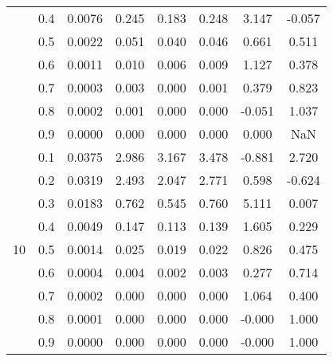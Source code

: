 \documentclass[11pt,a4paper]{report}
\begin{document}
\begin{longtable}{ | c | c || c | c | c | c | c | c | }
 & 0.4 & 0.0076 & 0.245 & 0.183 & 0.248 & 3.147 & -0.057 \\
 & 0.5 & 0.0022 & 0.051 & 0.040 & 0.046 & 0.661 & 0.511 \\
 & 0.6 & 0.0011 & 0.010 & 0.006 & 0.009 & 1.127 & 0.378 \\
 & 0.7 & 0.0003 & 0.003 & 0.000 & 0.001 & 0.379 & 0.823 \\
 & 0.8 & 0.0002 & 0.001 & 0.000 & 0.000 & -0.051 & 1.037 \\
 & 0.9 & 0.0000 & 0.000 & 0.000 & 0.000 & 0.000 & NaN \\
 \hline
\multirow{9}{*}{10} & 0.1 & 0.0375 & 2.986 & 3.167 & 3.478 & -0.881 & 2.720 \\
 & 0.2 & 0.0319 & 2.493 & 2.047 & 2.771 & 0.598 & -0.624 \\
 & 0.3 & 0.0183 & 0.762 & 0.545 & 0.760 & 5.111 & 0.007 \\
 & 0.4 & 0.0049 & 0.147 & 0.113 & 0.139 & 1.605 & 0.229 \\
 & 0.5 & 0.0014 & 0.025 & 0.019 & 0.022 & 0.826 & 0.475 \\
 & 0.6 & 0.0004 & 0.004 & 0.002 & 0.003 & 0.277 & 0.714 \\
 & 0.7 & 0.0002 & 0.000 & 0.000 & 0.000 & 1.064 & 0.400 \\
 & 0.8 & 0.0001 & 0.000 & 0.000 & 0.000 & -0.000 & 1.000 \\
 & 0.9 & 0.0000 & 0.000 & 0.000 & 0.000 & -0.000 & 1.000 \\
 \hline
\hline
\end{longtable}
\end{document}
